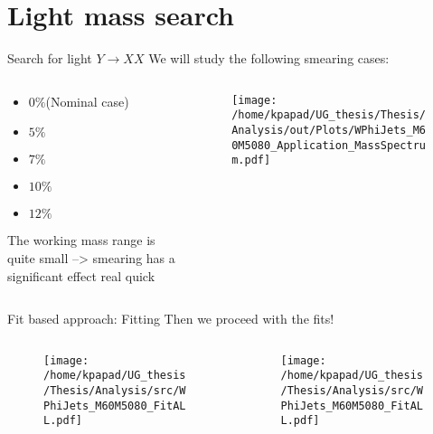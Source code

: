 \documentclass[bigger]{beamer}
\begin{document}
\section{Light mass search}
\label{sec:org87346d1}
\begin{frame}[label={sec:orgc50083a}]{Search for light \(Y \rightarrow XX\)}
We will study the following smearing cases:
\begin{columns}
\begin{column}{0.5\columnwidth}
\begin{itemize}
\item \(0\%\)(Nominal case)
\item \(5\%\)
\item \(7\%\)
\item \(10\%\)
\item \(12\%\)
\end{itemize}
The working mass range is quite small --> smearing has a significant effect real quick 
\end{column}
\begin{column}{0.5\columnwidth}
\begin{figure}[h]
\centering
\texttt{[image: /home/kpapad/UG\_thesis/Thesis/Analysis/out/Plots/WPhiJets\_M60M5080\_Application\_MassSpectrum.pdf]}
\end{figure}
\end{column}
\end{columns}
\end{frame}
\begin{frame}[label={sec:org0d5b4eb}]{Fit based approach: Fitting}
Then we proceed with the fits!
\begin{columns}
\begin{column}{0.5\columnwidth}
\begin{figure}[h]
\centering
\texttt{[image: /home/kpapad/UG\_thesis/Thesis/Analysis/src/WPhiJets\_M60M5080\_FitALL.pdf]}
\end{figure}
\end{column}

\begin{column}{0.5\columnwidth}
\begin{figure}[h]
\centering
\texttt{[image: /home/kpapad/UG\_thesis/Thesis/Analysis/src/WPhiJets\_M60M5080\_FitALL.pdf]}
\end{figure}
\end{column}
\end{columns}
\end{frame}
\end{document}
